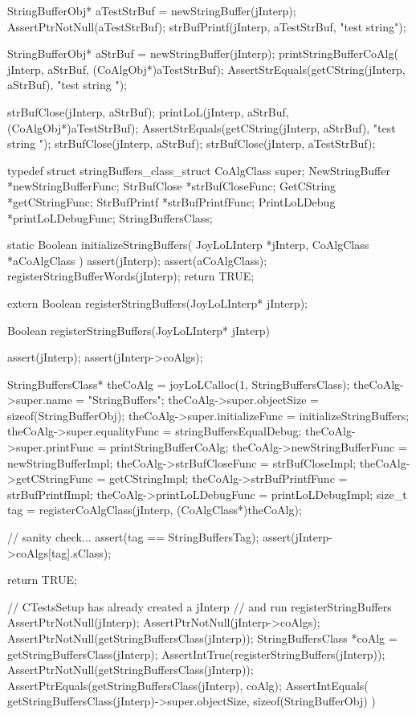   StringBufferObj* aTestStrBuf = newStringBuffer(jInterp);
  AssertPtrNotNull(aTestStrBuf);
  strBufPrintf(jInterp, aTestStrBuf, "test string");
  
  StringBufferObj* aStrBuf = newStringBuffer(jInterp);
  printStringBufferCoAlg(
    jInterp, aStrBuf, (CoAlgObj*)aTestStrBuf);
  AssertStrEquals(getCString(jInterp, aStrBuf), "test string ");
  
  strBufClose(jInterp, aStrBuf);
  printLoL(jInterp, aStrBuf, (CoAlgObj*)aTestStrBuf);
  AssertStrEquals(getCString(jInterp, aStrBuf), "test string ");
  strBufClose(jInterp, aStrBuf);
  strBufClose(jInterp, aTestStrBuf);
\stopCTest
\stopTestCase
\stopTestSuite

\startTestSuite[registerStringBuffers]

\startCHeader
typedef struct stringBuffers_class_struct {
  CoAlgClass       super;
  NewStringBuffer *newStringBufferFunc;
  StrBufClose     *strBufCloseFunc;
  GetCString      *getCStringFunc;
  StrBufPrintf    *strBufPrintfFunc;
  PrintLoLDebug   *printLoLDebugFunc;
} StringBuffersClass;
\stopCHeader

\startCCode
static Boolean initializeStringBuffers(
  JoyLoLInterp *jInterp,
  CoAlgClass   *aCoAlgClass
) {
  assert(jInterp);
  assert(aCoAlgClass);
  registerStringBufferWords(jInterp);
  return TRUE;
}
\stopCCode

\startCHeader
extern Boolean registerStringBuffers(JoyLoLInterp* jInterp);
\stopCHeader
{}

\startCCode
Boolean registerStringBuffers(JoyLoLInterp* jInterp) {
  assert(jInterp);
  assert(jInterp->coAlgs);
  
  StringBuffersClass* theCoAlg  =
    joyLoLCalloc(1, StringBuffersClass);
  theCoAlg->super.name            = "StringBuffers";
  theCoAlg->super.objectSize      = sizeof(StringBufferObj);
  theCoAlg->super.initializeFunc  = initializeStringBuffers;
  theCoAlg->super.equalityFunc    = stringBuffersEqualDebug;
  theCoAlg->super.printFunc       = printStringBufferCoAlg;
  theCoAlg->newStringBufferFunc   = newStringBufferImpl;
  theCoAlg->strBufCloseFunc       = strBufCloseImpl;
  theCoAlg->getCStringFunc        = getCStringImpl;
  theCoAlg->strBufPrintfFunc      = strBufPrintfImpl;
  theCoAlg->printLoLDebugFunc     = printLoLDebugImpl;
  size_t tag =
    registerCoAlgClass(jInterp, (CoAlgClass*)theCoAlg);
  
  // sanity check...
  assert(tag == StringBuffersTag);
  assert(jInterp->coAlgs[tag].sClass);

  return TRUE;
}
\stopCCode


\startCTest
  // CTestsSetup has already created a jInterp
  // and run registerStringBuffers
  AssertPtrNotNull(jInterp);
  AssertPtrNotNull(jInterp->coAlgs);
  AssertPtrNotNull(getStringBuffersClass(jInterp));
  StringBuffersClass *coAlg =
    getStringBuffersClass(jInterp);
  AssertIntTrue(registerStringBuffers(jInterp));
  AssertPtrNotNull(getStringBuffersClass(jInterp));
  AssertPtrEquals(getStringBuffersClass(jInterp), coAlg);
  AssertIntEquals(
    getStringBuffersClass(jInterp)->super.objectSize,
    sizeof(StringBufferObj)
  )
\stopCTest
\stopTestCase
\stopTestSuite
